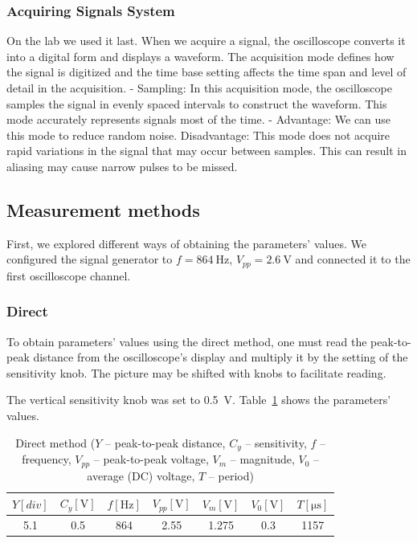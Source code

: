 \subsubsection*{Acquiring Signals System}
On the lab we used it last.
When we acquire a signal, the oscilloscope converts it into a digital form and
displays a waveform. The acquisition mode defines how the signal is digitized and
the time base setting affects the time span and level of detail in the acquisition.
- Sampling: In this acquisition mode, the oscilloscope samples the signal in
evenly spaced intervals to construct the waveform. This mode accurately
represents signals most of the time.
- Advantage: We can use this mode to reduce random noise.
  Disadvantage: This mode does not acquire rapid variations in the signal that may occur between samples. This can result in aliasing may cause narrow pulses to be
  missed.

\subsection{Measurement methods}

First, we explored different ways of obtaining the parameters' values. We configured the signal generator to $f = \SI{864}{\hertz}$, $V_{pp} = \SI{2.6}{\volt}$ and connected it to the first oscilloscope channel.

\subsubsection*{Direct}

 To obtain parameters' values using the direct method, one must read the peak-to-peak distance from the oscilloscope's display and multiply it by the setting of the sensitivity knob. The picture may be shifted with knobs to facilitate reading.

The vertical sensitivity knob was set to \SI{0.5}{\volt}. Table~\ref{tab:direct-method} shows the parameters' values.

\begin{table}[H]
	\centering
	\begin{tabular}{c|c|c|c|c|c|c}
		$Y [div]$ & $C_{y} [\unit{\volt}]$ & $f [\unit{\hertz}]$ & $V_{pp} [\unit{\volt}]$ & $V_{m} [\unit{\volt}]$ & $V_{0} [\unit{\volt}]$ & $T [\unit{\micro\second}]$\\
		\hline
		5.1 & 0.5 & 864 & 2.55 & 1.275 & 0.3 & 1157
	\end{tabular}
	\caption{Direct method ($Y$ -- peak-to-peak distance, $C_{y}$ -- sensitivity, $f$ -- frequency, $V_{pp}$ -- peak-to-peak voltage, $V_{m}$ -- magnitude, $V_{0}$ -- average (DC) voltage, $T$ -- period)}
	\label{tab:direct-method}
\end{table}

